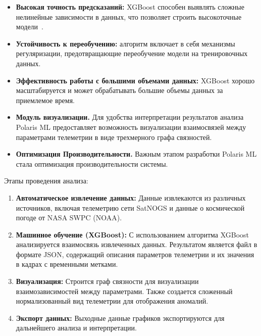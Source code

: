 \documentclass[14pt, a4paper]{../cls/coursework}
\begin{document}
    \begin{itemize}
        \item \textbf{Высокая точность предсказаний:} XGBoost способен выявлять сложные нелинейные зависимости в данных, что позволяет строить высокоточные модели~\cite{behaviour_based_anomaly_detection}.
        \item \textbf{Устойчивость к переобучению:} алгоритм включает в себя механизмы регуляризации, предотвращающие переобучение модели на тренировочных данных.
        \item \textbf{Эффективность работы с большими объемами данных:} XGBoost хорошо масштабируется и может обрабатывать большие объемы данных за приемлемое время.
        \item \textbf{Модуль визуализации.} Для удобства интерпретации результатов анализа Polaris ML предоставляет возможность визуализации взаимосвязей между параметрами телеметрии в виде трехмерного графа связностей.
        \item \textbf{Оптимизация Производительности.} Важным этапом разработки Polaris ML стала оптимизация производительности системы.
    \end{itemize}

    Этапы проведения анализа:

    \begin{enumerate}[label=\arabic*.]
        \item \textbf{Автоматическое извлечение данных:}
        Данные извлекаются из различных источников, включая телеметрию сети SatNOGS и данные о космической погоде от NASA SWPC (NOAA).

        \item \textbf{Машинное обучение (XGBoost):}
        С использованием алгоритма XGBoost~\cite{xgboost_docs,boumghar_2018_enhanced} анализируется взаимосвязь извлеченных данных.
        Результатом является файл в формате JSON, содержащий описания параметров телеметрии и их значения в кадрах с временными метками.

        \item \textbf{Визуализация:}
        Строится граф связности для визуализации взаимозависимостей между параметрами.
        Также создается сложенный нормализованный вид телеметрии для отображения аномалий.

        \item \textbf{Экспорт данных:}
        Выходные данные графиков экспортируются для дальнейшего анализа и интерпретации.
    \end{enumerate}
\end{document}
